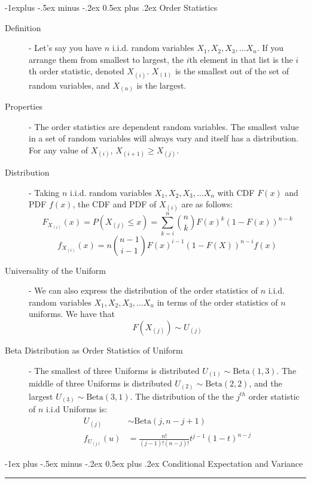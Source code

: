 \documentclass[10pt,landscape]{article}
\makeatletter
\newcommand{\Beta}{\textrm{Beta}}
\renewcommand{\section}{\@startsection{section}{1}{0mm}%
                                {-1ex plus -.5ex minus -.2ex}%
                                {0.5ex plus .2ex}%
                                {\normalfont\large\bfseries}}
\renewcommand{\subsection}{\@startsection{subsection}{2}{0mm}%
                                {-1explus -.5ex minus -.2ex}%
                                {0.5ex plus .2ex}%
                                {\normalfont\normalsize\bfseries}}
\makeatother
\begin{document}
\begin{multicols}{3}
\subsection{Order Statistics}
\begin{description}
    \item[Definition] - Let's say you have $n$ i.i.d. random variables $X_1, X_2, X_3, \dots X_n$. If you arrange them from smallest to largest, the $i$th element in that list is the $i$th order statistic, denoted $X_{(i)}$. $X_{(1)}$ is the smallest out of the set of random variables, and $X_{(n)}$ is the largest.
    \item[Properties] - The order statistics are dependent random variables. The smallest value in a set of random variables will always vary and itself has a distribution. For any value of $X_{(i)}$, $X_{(i+1)} \geq X_{(j)}$.
    \item[Distribution] - Taking $n$ i.i.d. random variables $X_1, X_2, X_3, \dots X_n$ with CDF $F(x)$ and PDF $f(x)$, the CDF and PDF of $X_{(i)}$ are as follows:
    \[F_{X_{(i)}}(x) = P (X_{(j)} \leq x) = \sum_{k=i}^n {n \choose k} F(x)^k(1 - F(x))^{n - k}\]
    \[f_{X_{(i)}}(x) = n{n - 1 \choose i - 1}F(x)^{i-1}(1 - F(X))^{n-i}f(x)\]
    \item[Universality of the Uniform] - We can also express the distribution of the order statistics of $n$  i.i.d. random variables $X_1, X_2, X_3, \dots X_n$ in terms of the order statistics of $n$ uniforms. We have that
    \[F(X_{(j)}) \sim U_{(j)}\]
    \item[Beta Distribution as Order Statistics of Uniform] -  The smallest of three Uniforms is distributed $U_{(1)} \sim \Beta(1, 3)$. The middle of three Uniforms is distributed $U_{(2)} \sim \Beta(2, 2)$, and the largest $U_{(3)} \sim \Beta(3, 1)$. The distribution of the the $j^{th}$ order statistic of $n$ i.i.d Uniforms is:
    \begin{align*}
        U_{(j)} &\sim \Beta(j, n - j + 1) \\
        f_{U_{(j)}}(u) &= \frac{n!}{(j-1)!(n-j)!}t^{j-1}(1-t)^{n-j}
    \end{align*}
\end{description}


\section{Conditional Expectation and Variance}\smallskip \hrule height 2pt \smallskip


\end{multicols}
\end{document}
